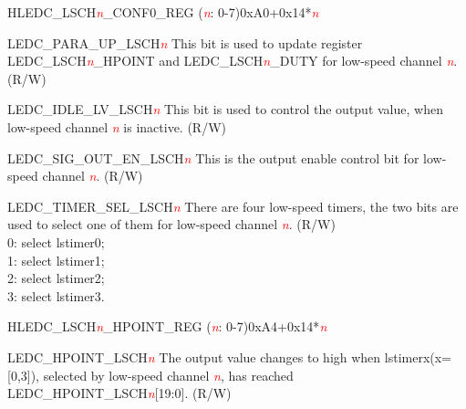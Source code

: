 \begin{register}{H}{LEDC\_LSCH\textcolor{red}{\it{n}}\_CONF0\_REG (\textcolor{red}{\it{n}}: 0-7)}{0xA0+0x14*\textcolor{red}{\it{n}}}\label{regdesc:LEDCLSCHnCONF0REG}
%
%
%
%
%
\regnewline%
\begin{regdesc}\begin{reglist}
\item [LEDC\_PARA\_UP\_LSCH\textcolor{red}{\it{n}}]This bit is used to update register LEDC\_LSCH\textcolor{red}{\it{n}}\_HPOINT and LEDC\_LSCH\textcolor{red}{\it{n}}\_DUTY for low-speed channel \textcolor{red}{\it{n}}. (R/W)
\item [LEDC\_IDLE\_LV\_LSCH\textcolor{red}{\it{n}}]This bit is used to control the output value, when low-speed channel \textcolor{red}{\it{n}} is inactive. (R/W)
\item [LEDC\_SIG\_OUT\_EN\_LSCH\textcolor{red}{\it{n}}]This is the output enable control bit for low-speed channel \textcolor{red}{\it{n}}. (R/W)
\item [LEDC\_TIMER\_SEL\_LSCH\textcolor{red}{\it{n}}]There are four low-speed timers, the two bits are used to select one of them for low-speed channel \textcolor{red}{\it{n}}.  (R/W) \\0: select lstimer0; \\1: select lstimer1;  \\2: select lstimer2;  \\3: select lstimer3.
\end{reglist}\end{regdesc}
\end{register}


\begin{register}{H}{LEDC\_LSCH\textcolor{red}{\it{n}}\_HPOINT\_REG (\textcolor{red}{\it{n}}: 0-7)}{0xA4+0x14*\textcolor{red}{\it{n}}}\label{regdesc:LEDCLSCHnHPOINTREG}
%
%
\regnewline%
\begin{regdesc}\begin{reglist}
\item [LEDC\_HPOINT\_LSCH\textcolor{red}{\it{n}}]The output value changes to high when lstimerx(x=[0,3]), selected by low-speed channel \textcolor{red}{\it{n}}, has reached LEDC\_HPOINT\_LSCH\textcolor{red}{\it{n}}[19:0]. (R/W)
\end{reglist}\end{regdesc}
\end{register}


